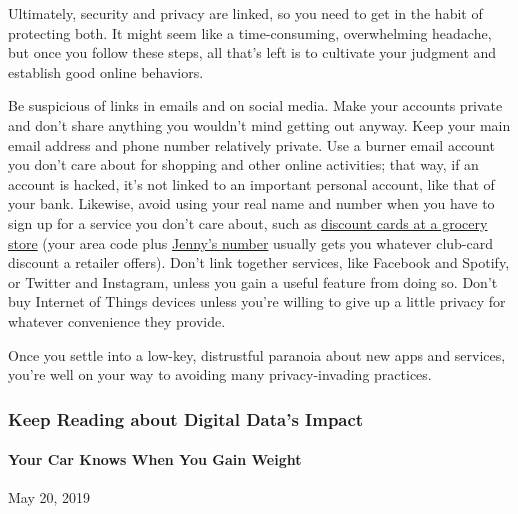 Ultimately, security and privacy are linked, so you need to get in the
habit of protecting both. It might seem like a time-consuming,
overwhelming headache, but once you follow these steps, all that's left
is to cultivate your judgment and establish good online behaviors.

Be suspicious of links in emails and on social media. Make your accounts
private and don't share anything you wouldn't mind getting out anyway.
Keep your main email address and phone number relatively private. Use a
burner email account you don't care about for shopping and other online
activities; that way, if an account is hacked, it's not linked to an
important personal account, like that of your bank. Likewise, avoid
using your real name and number when you have to sign up for a service
you don't care about, such as
\href{https://www.nytimes.com/2013/03/26/technology/facebook-expands-targeted-advertising-through-outside-data-sources.html}{discount
cards at a grocery store} (your area code plus
\href{https://en.wikipedia.org/wiki/867-5309/Jenny}{Jenny's number}
usually gets you whatever club-card discount a retailer offers). Don't
link together services, like Facebook and Spotify, or Twitter and
Instagram, unless you gain a useful feature from doing so. Don't buy
Internet of Things devices unless you're willing to give up a little
privacy for whatever convenience they provide.~

Once you settle into a low-key, distrustful paranoia about new apps and
services, you're well on your way to avoiding many privacy-invading
practices.

\hypertarget{keep-reading-about-digital-datas-impact}{%
\subsubsection{Keep Reading about Digital Data's
Impact}\label{keep-reading-about-digital-datas-impact}}

\href{https://www.nytimes.com/2019/05/20/opinion/car-repair-data-privacy.html}{}

\hypertarget{your-car-knows-when-you-gain-weight}{%
\paragraph{Your Car Knows When You Gain
Weight}\label{your-car-knows-when-you-gain-weight}}

May 20, 2019

\href{https://www.nytimes.com/2019/06/13/opinion/privacy-law-enforcment-congress.html}{}

